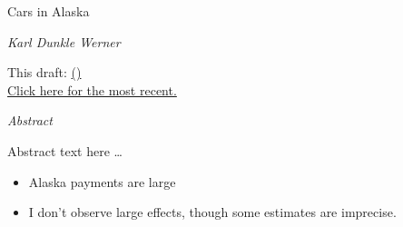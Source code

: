 \documentclass[11pt,letterpaper,oneside]{article}
\begin{document}
\thispagestyle{empty}
\setcounter{page}{0}
\vspace*{0.7in plus 0.3in minus 0.3in}

\begin{center}
    {\Huge Cars in Alaska}

    \textit{\Large Karl Dunkle Werner}

\vspace{1em}
  This draft: \gitCommitterDate{}
    \href{https://github.com/karldw/second_year_paper/tree/\gitHash}{
    (\textsc{\gitAbbrevHash{}})}\\
    \href{http://karldw.org/second_year_paper.pdf}{Click here for the most recent.}
\end{center}

\vspace{2in plus 1in minus 0.7in}

\begin{center}
    \begin{minipage}{0.7\linewidth}
        \begin{center}
            \textit{Abstract}
        \end{center}
        Abstract text here \ldots
        \begin{itemize}
            \item Alaska payments are large
            \item I don't observe large effects, though some estimates are imprecise.

        \end{itemize}
    \end{minipage}
\end{center}
\end{document}
